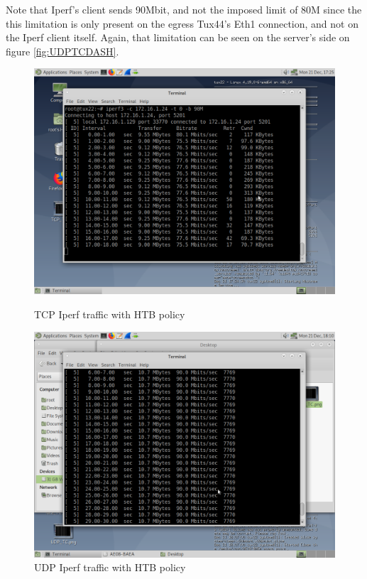 \documentclass{article}
\begin{document}
Note that Iperf's client sends 90Mbit, and not the imposed limit of 80M since 
the this limitation is only present on the egress Tux44's Eth1 connection, and 
not on the Iperf client itself.
Again, that limitation can be seen on the server's side on figure 
\ref{fig:UDPTCDASH}.

\begin{figure}[h!]
    \centering
    \begin{minipage}{0.45\linewidth}
        \centering
        \includegraphics[width=1.2\textwidth]{TCPIperf_TC} 
        \caption{TCP Iperf traffic with HTB policy}
        \label{fig:TCPIperf_TC}
    \end{minipage}\hfill
    \begin{minipage}{0.45\textwidth}
        \centering
        \includegraphics[width=1.2\linewidth]{UDPIperf_TC}
        \caption{UDP Iperf traffic with HTB policy}
        \label{fig:UDPIperf_TC}
    \end{minipage}
\end{figure}
\FloatBarrier	
\end{document}
